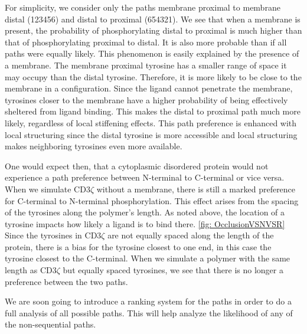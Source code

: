 \documentclass[../../AdvancementSummary.tex]{subfiles}
\begin{document}
For simplicity, we consider only the paths membrane proximal to membrane distal (123456) and distal to proximal (654321). We see that when a membrane is present, the probability of phosphorylating distal to proximal is much higher than that of phosphorylating proximal to distal.  It is also more probable than if all paths were equally likely. This phenomenon is easily explained by the presence of a membrane. The membrane proximal tyrosine has a smaller range of space it may occupy than the distal tyrosine.  Therefore, it is more likely to be close to the membrane in a configuration.  Since the ligand cannot penetrate the membrane, tyrosines closer to the membrane have a higher probability of being effectively sheltered from ligand binding. This makes the distal to proximal path much more likely, regardless of local stiffening effects. This path preference is enhanced with local structuring since the distal tyrosine is more accessible and local structuring makes neighboring tyrosines even more available.

One would expect then, that a cytoplasmic disordered protein would not experience a path preference between N-terminal to C-terminal or vice versa. When we simulate CD3$\zeta$ without a membrane, there is still a marked preference for C-terminal to N-terminal phosphorylation.  This effect arises from the spacing of the tyrosines along the polymer's length.  As noted above, the location of a tyrosine impacts how likely a ligand is to bind there. \ref{fig: OcclusionVSNVSR} Since the tyrosines in CD3$\zeta$ are not equally spaced along the length of the protein, there is a bias for the tyrosine closest to one end, in this case the tyrosine closest to the C-terminal. When we simulate a polymer with the same length as CD3$\zeta$ but equally spaced tyrosines, we see that there is no longer a preference between the two paths. 

We are soon going to introduce a ranking system for the paths in order to do a full analysis of all possible paths. This will help analyze the likelihood of any of the non-sequential paths.
\end{document}
